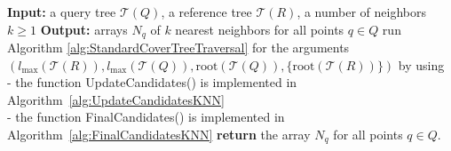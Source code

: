 \documentclass[a4paper,UKenglish,cleveref, autoref]{lipics-v2019}
\numberwithin{algocf}{section}
\theoremstyle{definition}
\theoremstyle{definition}
\theoremstyle{definition}
\theoremstyle{plain}
\newcommand{\T}{\mathcal{T}}
\begin{document}
\begin{algorithm}
\caption{The new algorithm for all $k$-nearest neighbors by using paired trees on $Q,R$}
\label{alg:paired_tree_knn}
\begin{algorithmic}[1]
\STATE \textbf{Input:} a query tree $\T(Q)$, a reference tree $\T(R)$, a number of neighbors $k\geq 1$
\STATE \textbf{Output:} arrays $N_q$ of $k$ nearest neighbors for all points $q \in Q$
\STATE run Algorithm \ref{alg:StandardCoverTreeTraversal} for the arguments
$( l_{\max}(\T(R)), l_{\max}(\T(Q)), \text{root}(\T(Q)), \{\text{root}(\T(R)) \} )$ by using \\
- the function UpdateCandidates() is implemented in Algorithm~\ref{alg:UpdateCandidatesKNN} \\
- the function FinalCandidates() is implemented in Algorithm~\ref{alg:FinalCandidatesKNN}
\STATE \textbf{return} the array $N_q$ for all points $q \in Q$. 
\end{algorithmic}
\end{algorithm}
\end{document}
